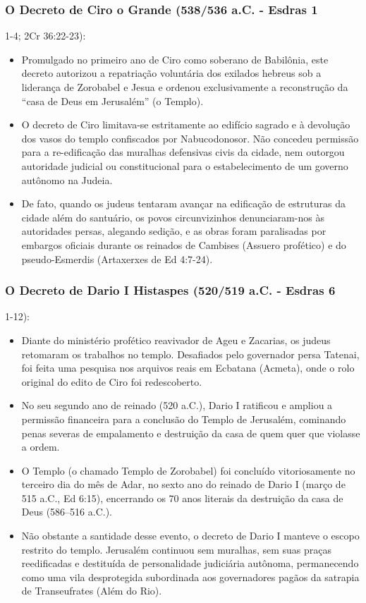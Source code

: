 \subsubsection*{O Decreto de Ciro o Grande (538/536 a.C. - Esdras 1}
1-4; 2Cr 36:22-23):
\begin{itemize}
  \item Promulgado no primeiro ano de Ciro como soberano de Babilônia, este decreto autorizou a repatriação voluntária dos exilados hebreus sob a liderança de Zorobabel e Jesua e ordenou exclusivamente a reconstrução da ``casa de Deus em Jerusalém'' (o Templo).
  \item O decreto de Ciro limitava-se estritamente ao edifício sagrado e à devolução dos vasos do templo confiscados por Nabucodonosor. Não concedeu permissão para a re-edificação das muralhas defensivas civis da cidade, nem outorgou autoridade judicial ou constitucional para o estabelecimento de um governo autônomo na Judeia.
  \item De fato, quando os judeus tentaram avançar na edificação de estruturas da cidade além do santuário, os povos circunvizinhos denunciaram-nos às autoridades persas, alegando sedição, e as obras foram paralisadas por embargos oficiais durante os reinados de Cambises (Assuero profético) e do pseudo-Esmerdis (Artaxerxes de Ed 4:7-24).
\end{itemize}



\subsubsection*{O Decreto de Dario I Histaspes (520/519 a.C. - Esdras 6}
1-12):
\begin{itemize}
  \item Diante do ministério profético reavivador de Ageu e Zacarias, os judeus retomaram os trabalhos no templo. Desafiados pelo governador persa Tatenai, foi feita uma pesquisa nos arquivos reais em Ecbatana (Acmeta), onde o rolo original do edito de Ciro foi redescoberto.
  \item No seu segundo ano de reinado (520 a.C.), Dario I ratificou e ampliou a permissão financeira para a conclusão do Templo de Jerusalém, cominando penas severas de empalamento e destruição da casa de quem quer que violasse a ordem.
  \item O Templo (o chamado Templo de Zorobabel) foi concluído vitoriosamente no terceiro dia do mês de Adar, no sexto ano do reinado de Dario I (março de 515 a.C., Ed 6:15), encerrando os 70 anos literais da destruição da casa de Deus (586–516 a.C.).
  \item Não obstante a santidade desse evento, o decreto de Dario I manteve o escopo restrito do templo. Jerusalém continuou sem muralhas, sem suas praças reedificadas e destituída de personalidade judiciária autônoma, permanecendo como uma vila desprotegida subordinada aos governadores pagãos da satrapia de Transeufrates (Além do Rio).
\end{itemize}



